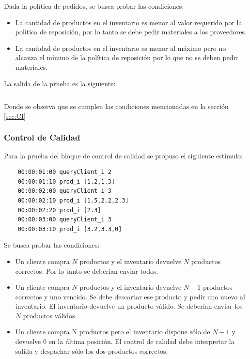 \documentclass[10pt]{article}
\begin{document}
Dada la política de pedidos, se busca probar las condiciones:
\begin{itemize}
\item La cantidad de productos en el inventario es menor al valor requerido por la política de reposición, por lo tanto se debe pedir materiales a los proveedores.
\item  La cantidad de productos en el inventario es menor al máximo pero no alcanza el mínimo de la política de reposición por lo que no se deben pedir materiales.
\end{itemize}

La salida de la prueba es la siguiente:

\begin{minipage}{1\textwidth}
	\centering
	\begin{lstlisting}

	\end{lstlisting}
	
\end{minipage}
Donde se observa que se cumplen las condiciones mencionadas en la sección \ref{sec:CI}

\subsubsection{Control de Calidad}
Para la prueba del bloque de control de calidad se propuso el siguiente estímulo:

\begin{minipage}{1\textwidth}
	\centering
	\begin{lstlisting}
	00:00:01:00 queryClient_i 2
	00:00:01:10 prod_i [1.2,1.3]
	00:00:02:00 queryClient_i 3
	00:00:02:10 prod_i [1.5,2.2,2.3]
	00:00:02:20 prod_i [2.3]
	00:00:03:00 queryClient_i 3
	00:00:03:10 prod_i [3.2,3.3,0]
	\end{lstlisting}
	
	\centering
\end{minipage}

Se busca probar las condiciones:
\begin{itemize}
	\item Un cliente compra $N$ productos y el inventario devuelve $N$ productos correctos. Por lo tanto se deberían enviar todos.
	\item Un cliente compra $N$ productos y el inventario devuelve $N-1$ productos correctos y uno vencido. Se debe descartar ese producto y pedir uno nuevo al inventario. El inventario devuelve un producto válido. Se deberían enviar los $N$ productos válidos.
	\item Un cliente compra N productos pero el inventario dispone sólo de $N-1$ y devuelve $0$ en la última posición. El control de calidad debe interpretar la salida y despachar sólo los dos productos correctos.
\end{itemize}
\end{document}
